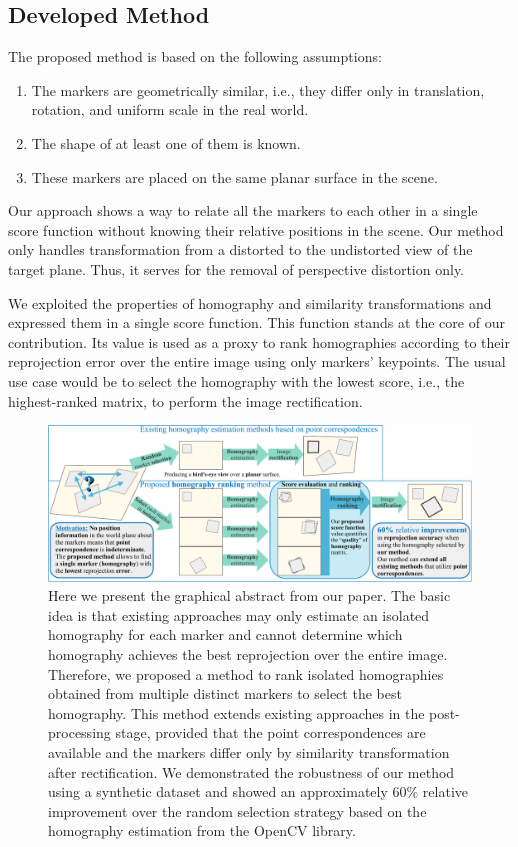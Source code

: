 \subsection{Developed Method}

The proposed method is based on the following assumptions:
\begin{enumerate}
    \item The markers are geometrically similar, i.e., they differ only in translation, rotation, and uniform scale in the real world.
    \item The shape of at least one of them is known.
    \item These markers are placed on the same planar surface in the scene.
\end{enumerate}
Our approach shows a way to relate all the markers to each other in a single score function without knowing their relative positions in the scene. Our method only handles transformation from a distorted to the undistorted view of the target plane. Thus, it serves for the removal of perspective distortion only.

We exploited the properties of homography and similarity transformations and expressed them in a single score function. This function stands at the core of our contribution. Its value is used as a proxy to rank homographies according to their reprojection error over the entire image using only markers' keypoints. The usual use case would be to select the homography with the lowest score, i.e., the highest-ranked matrix, to perform the image rectification.

\begin{figure}[t]
    \centerline{\includegraphics[width=\linewidth]{figures/methodology/graphical_abstract.pdf}}
    \caption[Homography ranking graphical abstract]{Here we present the graphical abstract from our paper. The basic idea is that existing approaches may only estimate an isolated homography for each marker and cannot determine which homography achieves the best reprojection over the entire image. Therefore, we proposed a method to rank isolated homographies obtained from multiple distinct markers to select the best homography. This method extends existing approaches in the post-processing stage, provided that the point correspondences are available and the markers differ only by similarity transformation after rectification. We demonstrated the robustness of our method using a synthetic dataset and showed an approximately $60\%$ relative improvement over the random selection strategy based on the homography estimation from the OpenCV library.}
    \label{fig:GraphicalAbstract}
\end{figure}

